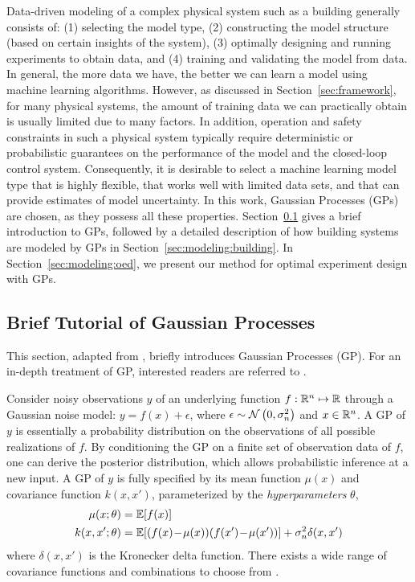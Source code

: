 Data-driven modeling of a complex physical system such as a building generally consists of: (1) selecting the model type, (2) constructing the model structure (based on certain insights of the system), (3) optimally designing and running experiments to obtain data, and (4) training and validating the model from data.
In general, the more data we have, the better we can learn a model using machine learning algorithms.
However, as discussed in Section~\ref{sec:framework}, for many physical systems, the amount of training data we can practically obtain is usually limited due to many factors.
In addition, operation and safety constraints in such a physical system typically require deterministic or probabilistic guarantees on the performance of the model and the closed-loop control system.
Consequently, it is desirable to select a machine learning model type that is highly flexible, that works well with limited data sets, and that can provide estimates of model uncertainty.
In this work, Gaussian Processes (GPs) are chosen, as they possess all these properties.
Section~\ref{sec:modeling:gp} gives a brief introduction to GPs, followed by a detailed description of how building systems are modeled by GPs in Section~\ref{sec:modeling:building}.
In Section~\ref{sec:modeling:oed}, we present our method for optimal experiment design with GPs.

\subsection{Brief Tutorial of Gaussian Processes}
\label{sec:modeling:gp}

This section, adapted from \cite{JainICCPS2018}, briefly introduces Gaussian Processes (GP).
For an in-depth treatment of GP, interested readers are referred to \cite{Rasmussen2006}.

Consider noisy observations \(y\) of an underlying function \(f: \mathbb{R}^n \mapsto \mathbb{R}\) through a Gaussian noise model: \(y = f(x) + \epsilon\), where \(\epsilon \sim \operatorname*{\mathcal{N}}\left(0, \sigma_n^2\right)\) and  \(x \in \mathbb{R}^n\).
A GP of $y$ is essentially a probability distribution on the observations of all possible realizations of $f$.
By conditioning the GP on a finite set of observation data of $f$, one can derive the posterior distribution, which allows probabilistic inference at a new input.
%
A GP of \(y\) is fully specified by its mean function \(\mu(x)\) and covariance function \(k(x,x')\), parameterized by the \emph{hyperparameters} \(\theta\),
\begin{align*}
\mu(x; \theta) &= \mathbb{E} [f(x)] \\
k(x,x'; \theta) &= \mathbb{E} [(f(x)\!-\!\mu(x)) (f(x') \!-\! \mu(x'))] + \sigma_n^2 \delta(x,x') \nonumber
\end{align*}
where \(\delta(x,x')\) is the Kronecker delta function.
There exists a wide range of covariance functions and combinations to choose from \cite{Rasmussen2006}.

